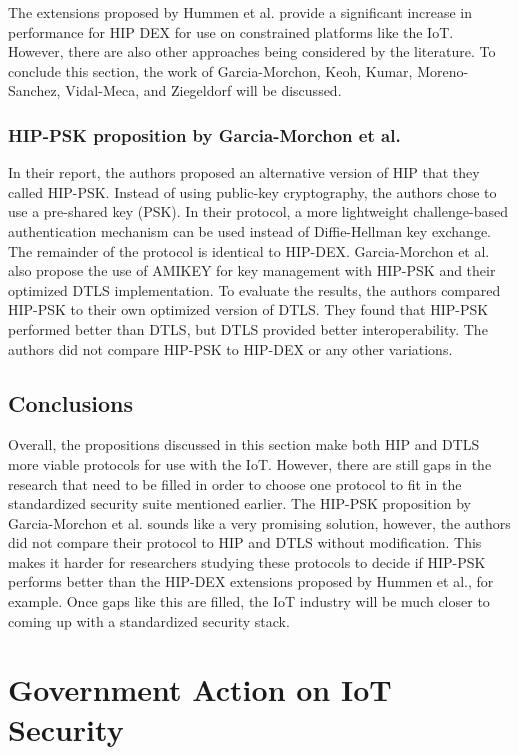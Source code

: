 \documentclass[letterpaper, 12pt]{article}
\begin{document}
\begin{flushleft}
The extensions proposed by Hummen et al. provide a significant increase in performance for HIP DEX for use on constrained platforms like the 
IoT. However, there are also other approaches being considered by the literature. To conclude this section, the work of Garcia-Morchon, Keoh, Kumar,
Moreno-Sanchez, Vidal-Meca, and Ziegeldorf will be discussed. 

\subsubsection*{HIP-PSK proposition by Garcia-Morchon et al.}
In their report, the authors proposed an alternative version of HIP that they called HIP-PSK. Instead of using public-key cryptography, the authors chose
to use a pre-shared key (PSK). In their protocol, a more lightweight challenge-based authentication mechanism can be used instead of Diffie-Hellman key
exchange. The remainder of the protocol is identical to HIP-DEX. Garcia-Morchon et al. also propose the use of AMIKEY for key management with HIP-PSK
and their optimized DTLS implementation. To evaluate the results, the authors compared HIP-PSK to their own optimized version of DTLS. They found that 
HIP-PSK performed better than DTLS, but DTLS provided better interoperability. The authors did not compare HIP-PSK to HIP-DEX or any other variations.

\subsection*{Conclusions}
Overall, the propositions discussed in this section make both HIP and DTLS more viable protocols for use with the IoT. However, there are still gaps in the 
research that need to be filled in order to choose one protocol to fit in the standardized security suite mentioned earlier. The HIP-PSK proposition by 
Garcia-Morchon et al. sounds like a very promising solution, however, the authors did not compare their protocol to HIP and DTLS without modification. This
makes it harder for researchers studying these protocols to decide if HIP-PSK performs better than the HIP-DEX extensions proposed by Hummen et al., for example.
Once gaps like this are filled, the IoT industry will be much closer to coming up with a standardized security stack. 

\section*{Government Action on IoT Security}


\end{flushleft}
\end{document}
